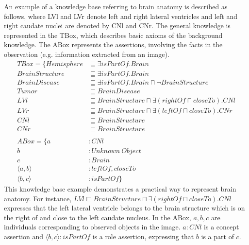 \documentclass{article}
\begin{document}
An example of a knowledge base referring to brain anatomy is described as follows, where LVl and LVr denote left and right lateral ventricles and left and right caudate nuclei are denoted by CNl and CNr.
The general knowledge is represented in the TBox, which describes basic axioms of the background knowledge. The ABox represents the assertions, involving the facts in the observation (e.g. information
extracted from an image).
\begin{align*}
 TBox=\{ Hemisphere &\sqsubseteq \exists isPartOf. Brain\\
	 BrainStructure &\sqsubseteq \exists isPartOf. Brain\\
	 BrainDisease &\sqsubseteq \exists isPartOf. Brain \sqcap \neg BrainStructure\\
	 Tumor  &\sqsubseteq BrainDisease\\
	 LVl &\sqsubseteq BrainStructure \sqcap \exists (rightOf \sqcap closeTo). CNl\\
	 LVr &\sqsubseteq BrainStructure \sqcap \exists (leftOf \sqcap closeTo). CNr\\
	 CNl &\sqsubseteq BrainStructure\\
	 CNr &\sqsubseteq BrainStructure\\
\\
 ABox=\{ a&: CNl \\
	 b&: Unknown~Object\\
	 c&: Brain \\
	 \langle a,b\rangle &: leftOf, closeTo \\
	 \langle b,c\rangle &: isPartOf\}
\end{align*}
This knowledge base  example demonstrates a practical way to represent brain anatomy. 
For instance, $LVl \sqsubseteq BrainStructure \sqcap \exists (rightOf \sqcap closeTo). CNl$ expresses that
the left lateral ventricle belongs to the brain structure which is on the right of and close to the left caudate nucleus.
In the ABox, $a,b,c$ are individuals corresponding to observed objects in the image. $a: CNl$ is a concept assertion and 
$\langle b,c\rangle : isPartOf$ is a role assertion, expressing that $b$ is a part of $c$.
\end{document}
